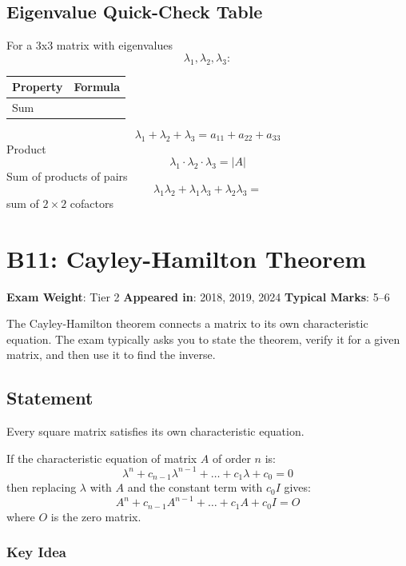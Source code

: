\documentclass[
]{article}
\renewenvironment{quote}
  {\begin{tcolorbox}[
     colback=calloutbg,
     colframe=calloutframe,
     colupper=callouttext,
     arc=3pt,
     boxrule=0.5pt,
     leftrule=0.5pt,
     borderline west={3pt}{0pt}{calloutaccent},
     left=8pt,
     right=8pt,
     top=6pt,
     bottom=6pt
   ]}
  {\end{tcolorbox}}
\begin{document}
\subsection{Eigenvalue Quick-Check
Table}\label{eigenvalue-quick-check-table}

For a 3x3 matrix with eigenvalues
\[
\lambda_1, \lambda_2, \lambda_3:
\]
\begin{longtable}[]{@{}ll@{}}
\toprule\noalign{}
Property & Formula \\
\midrule\noalign{}
\endhead
\bottomrule\noalign{}
\endlastfoot
Sum & \\
\end{longtable}
\[
\lambda_1 + \lambda_2 + \lambda_3 = a_{11} + a_{22} + a_{33}
\]
\hfill\break
Product \textbar{}
\[
\lambda_1 \cdot \lambda_2 \cdot \lambda_3 = \lvert A \rvert
\]
\hfill\break
Sum of products of pairs \textbar{}
\[
\lambda_1 \lambda_2 + \lambda_1 \lambda_3 + \lambda_2 \lambda_3 =
\]
sum of \(2 \times 2\) cofactors \textbar{}

\section{B11: Cayley-Hamilton
Theorem}\label{b11-cayley-hamilton-theorem}

\begin{quote}
\textbf{Exam Weight}: Tier 2 \textbar{} \textbf{Appeared in}: 2018,
2019, 2024 \textbar{} \textbf{Typical Marks}: 5--6
\end{quote}

The Cayley-Hamilton theorem connects a matrix to its own characteristic
equation. The exam typically asks you to state the theorem, verify it
for a given matrix, and then use it to find the inverse.

\subsection{Statement}\label{statement-8}

Every square matrix satisfies its own characteristic equation.

If the characteristic equation of matrix \(A\) of order \(n\) is:
\[
\lambda^n + c_{n-1}\lambda^{n-1} + \dots + c_1\lambda + c_0 = 0
\]
then replacing \(\lambda\) with \(A\) and the constant term with
\(c_0 I\) gives:
\[
A^n + c_{n-1}A^{n-1} + \dots + c_1 A + c_0 I = O
\]
where \(O\) is the zero matrix.

\subsubsection{Key Idea}\label{key-idea-2}
\end{document}
